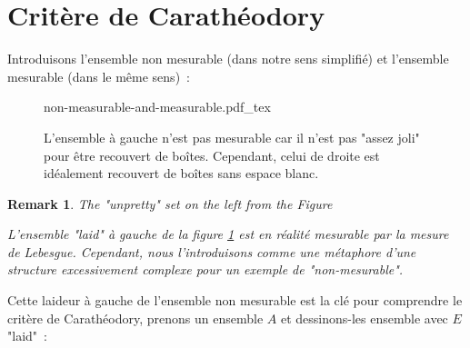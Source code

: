 \documentclass[a4paper]{article}
\newcommand{\incfig}[1]{%
    \def\svgwidth{\columnwidth}
    {#1.pdf_tex}
}
\newtheorem*{remark}{Remark}
\begin{document}
\section{Critère de Carathéodory}%

Introduisons l'ensemble non mesurable (dans notre sens simplifié) et l'ensemble mesurable (dans le même sens) :
\begin{figure}[H]
    
    \centering
    \incfig{non-measurable-and-measurable}
    \caption{L'ensemble à gauche n'est pas mesurable car il n'est pas "assez joli" pour être recouvert de boîtes. Cependant, celui de droite est idéalement recouvert de boîtes sans espace blanc.}
    \label{fig:non-measurable-and-measurable}
\end{figure}%


\begin{remark}
    The "unpretty" set on the left from the Figure
    
    L'ensemble "laid" à gauche de la figure
    \ref{fig:non-measurable-and-measurable} est en réalité mesurable par la mesure de Lebesgue. Cependant, nous l'introduisons comme une métaphore d'une structure excessivement complexe pour un exemple de "non-mesurable".
\end{remark}%


Cette laideur à gauche de l'ensemble non mesurable est la clé pour
comprendre le critère de Carathéodory, prenons un ensemble $A$ et dessinons-les
ensemble avec $E$ "laid" :
\end{document}
